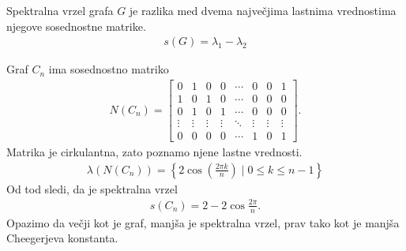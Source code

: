 \begin{definicija}
    Spektralna vrzel grafa \(G\) je razlika med dvema največjima lastnima vrednostima njegove sosednostne matrike.
    \begin{align*}
        s(G) = \lambda_1 - \lambda_2
    \end{align*}
\end{definicija}
\begin{primer}[Cikli]
    Graf \(C_n\) ima sosednostno matriko
    \begin{align*}
        N(C_n) = \begin{bmatrix}
                     0      & 1      & 0      & 0      & \cdots & 0      & 0      & 1      \\
                     1      & 0      & 1      & 0      & \cdots & 0      & 0      & 0      \\
                     0      & 1      & 0      & 1      & \cdots & 0      & 0      & 0      \\
                     \vdots & \vdots & \vdots & \vdots & \ddots & \vdots & \vdots & \vdots \\
                     0      & 0      & 0      & 0      & \cdots & 1      & 0      & 1
                 \end{bmatrix}.
    \end{align*}
    Matrika je cirkulantna, zato poznamo njene lastne vrednosti.
    \begin{align*}
        \lambda(N(C_n)) = \left\{ 2 \cos\left(\frac{2\pi k}{n}\right) \mid 0 \leq k \leq n-1\right\}
    \end{align*}
    Od tod sledi, da je spektralna vrzel
    \begin{align*}
        s(C_n) = 2 - 2\cos\frac{2\pi}{n}.
    \end{align*}
    Opazimo da večji kot je graf, manjša je spektralna vrzel, prav tako kot je manjša Cheegerjeva konstanta.
\end{primer}
